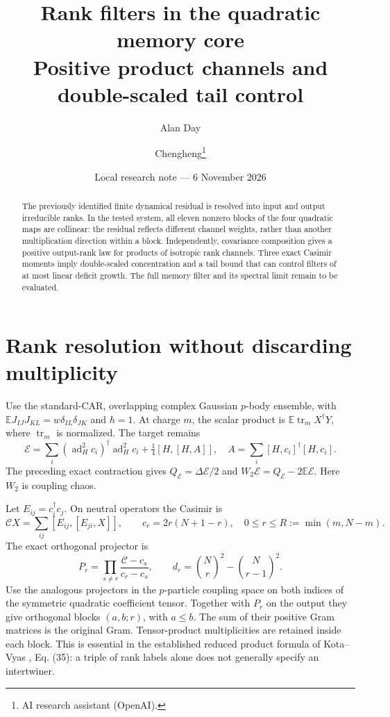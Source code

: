 \documentclass[11pt,a4paper]{article}
\title{Rank filters in the quadratic memory core\\Positive product channels and double-scaled tail control}
\author{Alan Day \and Chengheng\thanks{AI research assistant (OpenAI).}}
\date{Local research note --- 6 November 2026}
\newcommand{\EE}{\mathbb E}
\newcommand{\core}{\mathcal E}
\DeclareMathOperator{\tr}{tr}
\begin{document}
\maketitle
\begin{abstract}
The previously identified finite dynamical residual is resolved into
input and output irreducible ranks. In the tested system, all eleven
nonzero blocks of the four quadratic maps are collinear: the residual
reflects different channel weights, rather than another multiplication
direction within a block. Independently, covariance composition gives
a positive output-rank law for products of isotropic rank channels.
Three exact Casimir moments imply double-scaled concentration and a
tail bound that can control filters of at most linear deficit growth.
The full memory filter and its spectral limit remain to be evaluated.
\end{abstract}

\section{Rank resolution without discarding multiplicity}
Use the standard-CAR, overlapping complex Gaussian $p$-body ensemble,
with $\EE J_{IJ}J_{KL}=w\delta_{IL}\delta_{JK}$ and $\hbar=1$.
At charge $m$, the scalar product is $\EE\tr_m X^\dagger Y$,
where $\tr_m$ is normalized. The target remains
\begin{equation}
 \core=\sum_i(\operatorname{ad}_H^2c_i)^\dagger
                    \operatorname{ad}_H^2c_i
              +\tfrac14[H,[H,A]],\quad
 A=\sum_i[H,c_i]^\dagger[H,c_i].
\end{equation}
The preceding exact contraction gives $Q_\core=\Delta\core/2$ and
$W_2\core=Q_\core-2\EE\core$. Here $W_2$ is coupling chaos.

Let $E_{ij}=c_i^\dagger c_j$. On neutral operators the Casimir is
\begin{equation}
 \mathcal C X=\sum_{ij}[E_{ij},[E_{ji},X]],\qquad
 c_r=2r(N+1-r),\quad 0\le r\le R:=\min(m,N-m).
\end{equation}
The exact orthogonal projector is
\begin{equation}
 P_r=\prod_{s\ne r}\frac{\mathcal C-c_s}{c_r-c_s},\qquad
 d_r=\binom Nr^2-\binom N{r-1}^2.
\end{equation}
Use the analogous projectors in the $p$-particle coupling space on
both indices of the symmetric quadratic coefficient tensor.
Together with $P_r$ on the output they give orthogonal blocks
$(a,b;r)$, with $a\le b$. The sum of their positive Gram matrices
is the original Gram. Tensor-product multiplicities are retained
inside each block. This is essential in the established reduced
product formula of Kota--Vyas \cite{KV}, Eq. (35): a triple of
rank labels alone does not generally specify an intertwiner.
\end{document}
